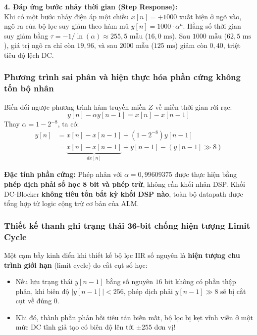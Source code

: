 \textbf{4. Đáp ứng bước nhảy thời gian (Step Response):}\\
Khi có một bước nhảy điện áp một chiều $x[n] = +1000$ xuất hiện ở ngõ vào, ngõ ra của bộ lọc suy giảm theo hàm mũ $y[n] = 1000 \cdot \alpha^n$. Hằng số thời gian suy giảm bằng $\tau = -1/\ln(\alpha) \approx 255{,}5\text{ mẫu}$ ($16{,}0\text{ ms}$). Sau $1000\text{ mẫu}$ ($62{,}5\text{ ms}$), giá trị ngõ ra chỉ còn $19{,}96$, và sau $2000\text{ mẫu}$ ($125\text{ ms}$) giảm còn $0{,}40$, triệt tiêu độ lệch DC.

\subsubsection*{Phương trình sai phân và hiện thực hóa phần cứng không tốn bộ nhân}
Biến đổi ngược phương trình hàm truyền miền $Z$ về miền thời gian rời rạc:
\begin{equation}
y[n] - \alpha y[n-1] = x[n] - x[n-1]
\end{equation}
Thay $\alpha = 1 - 2^{-8}$, ta có:
\begin{align}
y[n] &= x[n] - x[n-1] + (1 - 2^{-8}) y[n-1] \nonumber \\
     &= \underbrace{x[n] - x[n-1]}_{dx[n]} + y[n-1] - (y[n-1] \gg 8)
\end{align}

\begin{physicalinsight}
\textbf{Đặc tính phần cứng:} Phép nhân với $\alpha = 0{,}99609375$ được thực hiện bằng \textbf{phép dịch phải số học 8 bit và phép trừ}, không cần khối nhân DSP. 
Khối DC-Blocker \textbf{không tiêu tốn bất kỳ khối DSP nào}, toàn bộ datapath được tổng hợp từ logic cộng trừ cơ bản của ALM.
\end{physicalinsight}

\subsubsection*{Thiết kế thanh ghi trạng thái 36-bit chống hiện tượng Limit Cycle}
Một cạm bẫy kinh điển khi thiết kế bộ lọc IIR số nguyên là \textbf{hiện tượng chu trình giới hạn} (limit cycle) do cắt cụt số học:
\begin{itemize}[leftmargin=1.5em, itemsep=2pt]
    \item Nếu lưu trạng thái $y[n-1]$ bằng số nguyên $16\text{ bit}$ không có phần thập phân, khi biên độ $|y[n-1]| < 256$, phép dịch phải $y[n-1] \gg 8$ sẽ bị cắt cụt về đúng $0$.
    \item Khi đó, thành phần phản hồi tiêu tán biến mất, bộ lọc bị kẹt vĩnh viễn ở một mức DC tĩnh giả tạo có biên độ lên tới $\pm 255$ đơn vị!
\end{itemize}

